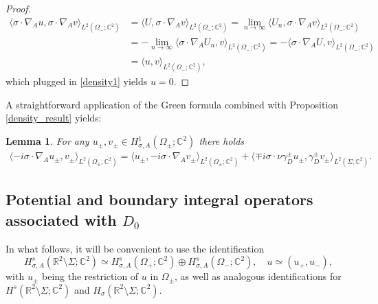 \documentclass[11pt,a4paper,reqno,oneside]{amsproc}
\def \rr {{\mathbb R}}
\def \cc {{\mathbb C}}
\numberwithin{equation}{section}
\def \cc {{\mathbb{C}}}
\newtheorem{lemma}[definition]{Lemma}
\begin{document}
\begin{proof}
\begin{align*}
   \langle \sigma\cdot\nabla_A u, \sigma\cdot\nabla_A v\rangle_{L^2(\Omega_-;\cc^2)}&= \langle U, \sigma\cdot\nabla_A v\rangle_{L^2(\Omega_-;\cc^2)}=\lim\limits_{n\rightarrow \infty}\langle  U_n, \sigma\cdot\nabla_Av\rangle_{L^2(\Omega_-;\cc^2)}\\
   &=-\lim\limits_{n\rightarrow \infty}\langle \sigma\cdot\nabla_A U_n, v\rangle_{L^2(\Omega_-;\cc^2)}=-\langle \sigma\cdot\nabla_A U, v\rangle_{L^2(\Omega_-;\cc^2)}\\
   &=\langle u, v\rangle_{L^2(\Omega_-;\cc^2)},
\end{align*}
which plugged in \eqref{density1} yields $u=0$.
\end{proof}
A straightforward application of the Green formula combined with Proposition \ref{density_result} yields: 
\begin{lemma}\label{Green} For any $u_\pm,v_\pm\in  H^1_{\sigma, A}(\Omega_\pm;\cc^2)$ there holds 
      \begin{align*}
    \langle -i\sigma\cdot\nabla_A u_\pm, v_\pm \rangle_{L^2(\Omega_\pm;\cc^2)}=\langle u_\pm, -i\sigma\cdot\nabla_A v_\pm \rangle_{L^2(\Omega_\pm;\cc^2)}+\langle \mp i\sigma\cdot\nu\gamma_D^\pm u_\pm, \gamma_D^\pm v_\pm \rangle_{L^2(\Sigma;\cc^2)}.
\end{align*}
\end{lemma}







\subsection{Potential and boundary integral operators associated with $D_0$}

In what follows, it will be convenient to use the identification
\[
H^s_{\sigma, A}(\rr^2\setminus\Sigma;\cc^2)\simeq H^s_{\sigma, A}(\Omega_+;\cc^2)\oplus H^s_{\sigma, A}(\Omega_-;\cc^2),
\quad
u\simeq (u_+,u_-),
\]
with $u_\pm$ being the restriction of $u$ in $\Omega_\pm$, as well as analogous identifications for $H^s(\rr^2\setminus\Sigma;\cc^2)$ and $H_\sigma(\rr^2\setminus\Sigma;\cc^2)$.
\end{document}
